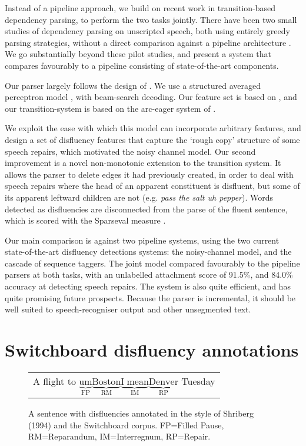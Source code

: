 \documentclass[11pt,letterpaper]{article}
\begin{document}
Instead of a pipeline approach, we build on recent work in transition-based dependency
parsing, to perform the two tasks jointly.
There have been two small studies of dependency parsing on unscripted speech,
both using entirely greedy parsing strategies, without a direct comparison
against a pipeline architecture \citep{jorgensen:07,rasooli:13}.  We go substantially
beyond these pilot studies, and present a system that compares favourably to a
pipeline consisting of state-of-the-art components.

Our parser largely follows the design of \citet{zhang:cl11}. We use a structured averaged
perceptron model \citep{collins:02}, with beam-search decoding. Our feature set
is based on \citet{zhang:cl11}, and our transition-system is based on the arc-eager
system of \citet{nivre:03}.

We exploit the ease with which this model can incorporate arbitrary features,
and design a set of disfluency features that capture the
`rough copy' structure of some speech repairs, which motivated the
\citet{Johnson04a} noisy channel model.
Our second improvement is a novel non-monotonic extension to the transition
system. It allows the parser to delete edges it had previously created, in order
to deal with speech repairs where the head of an apparent constituent is disfluent,
but some of its apparent leftward children are not (e.g. \emph{pass the salt uh pepper}).
Words detected as disfluencies are disconnected from the parse of the fluent sentence,
which is scored with the Sparseval measure \citep{sparseval}.

Our main comparison is against two pipeline systems, using the two current 
state-of-the-art disfluency detections systems: the \citet{Johnson04a} noisy-channel
model, and the \citet{qian:13} cascade of sequence taggers.  The joint model
compared favourably to the pipeline parsers at both tasks, with an unlabelled
attachment score of 91.5\%, and 84.0\% accuracy at detecting speech repairs.
The system is also quite efficient, and has quite promising future prospects.
Because the parser is incremental, it should be well suited
to speech-recogniser output and other unsegmented text.

\section{Switchboard disfluency annotations}
\label{sec:swbd}

\begin{figure}
    \begin{tabular}{l}

        A flight to $\underbrace{\mathrm{um}}_\text{FP} \underbrace{\mathrm{Boston}}_\text{RM} \underbrace{\mathrm{I\;mean}}_\text{IM} \underbrace{\mathrm{Denver}}_\text{RP}$ Tuesday\\

\end{tabular}
\caption{\small A sentence with disfluencies annotated in the style of Shriberg (1994) 
    and the Switchboard corpus.
FP=Filled Pause, RM=Reparandum, IM=Interregnum, RP=Repair.\label{fig:shriberg}}
\end{figure}
\end{document}
